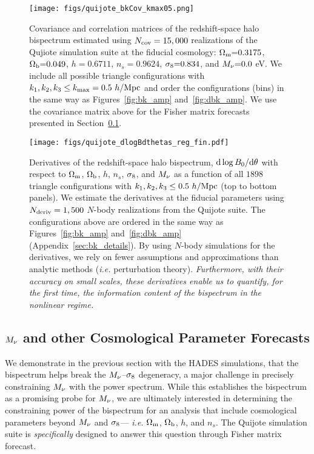 \begin{figure}
\begin{center}
    \texttt{[image: figs/quijote\_bkCov\_kmax05.png]} 
    \caption{Covariance and correlation matrices of the redshift-space halo bispectrum 
    estimated using $N_{\rm cov} = 15,000$ realizations of the Qujiote simulation suite at 
    the fiducial cosmology: $\Omega_{\rm m}{=}0.3175$, $\Omega_{\rm b}{=}0.049$, $h{=}0.6711$, $n_s{=}0.9624$, $\sigma_8{=}0.834$, 
    and $M_\nu{=}0.0$ eV. We include all possible triangle configurations with 
    $k_1, k_2, k_3 \leq k_{\rm max} = 0.5~h/{\rm Mpc}$ and order the configurations 
    (bins) in the same way as Figures~\ref{fig:bk_amp} and~\ref{fig:dbk_amp}. We 
    use the covariance matrix above for the Fisher matrix forecasts presented in 
    Section~\ref{sec:forecasts}. 
    }
\label{fig:bk_cov}
\end{center}
\end{figure}

\begin{figure}
\begin{center}
    \texttt{[image: figs/quijote\_dlogBdthetas\_reg\_fin.pdf]} 
    \caption{Derivatives of the redshift-space halo bispectrum, ${\rm d}\log B_0 / {\rm d} \theta$ 
    with respect to $\Omega_{\rm m}$, $\Omega_{\rm b}$, $h$, $n_s$, $\sigma_8$, and $M_\nu$ as a function 
    of all $1898$ triangle configurations with $k_1, k_2, k_3 \leq 0.5~h/{\rm Mpc}$ 
    (top to bottom panels). We estimate the derivatives at the fiducial parameters 
    using $N_{\rm deriv} = 1,500$ $N$-body realizations from the Quijote suite. 
    The configurations above are ordered in the same way as Figures~\ref{fig:bk_amp} 
    and~\ref{fig:dbk_amp} (Appendix~\ref{sec:bk_details}). 
    By using $N$-body simulations for the derivatives, we rely on fewer assumptions 
    and approximations than analytic methods (\emph{i.e.} perturbation theory). 
    \emph{Furthermore, with their accuracy on small scales, these derivatives enable 
    us to quantify, for the first time, the information content of the bispectrum in 
    the nonlinear regime.}
    }
\label{fig:bk_deriv}
\end{center}
\end{figure}

\subsection{$M_\nu$ and other Cosmological Parameter Forecasts} \label{sec:forecasts}
We demonstrate in the previous section with the HADES simulations, that 
the bispectrum helps break the $M_\nu$--$\sigma_8$ degeneracy, a major 
challenge in precisely constraining $M_\nu$ with the power spectrum. 
While this establishes the bispectrum as a promising probe for $M_\nu$, 
we are ultimately interested in determining the constraining power of the 
bispectrum for an analysis that include cosmological parameters beyond 
$M_\nu$ and $\sigma_8$--- \emph{i.e.} $\Omega_{\rm m}$, $\Omega_{\rm b}$, $h$, and $n_s$. The Quijote 
simulation suite is \emph{specifically} designed to answer this question
through Fisher matrix forecast.

